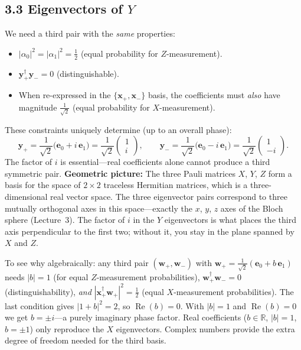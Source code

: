 \documentclass[12pt,a4paper]{article}
\begin{document}
\subsection{3.3 Eigenvectors of $Y$}
We need a third pair with the \emph{same} properties:
\begin{itemize}[nosep]
    \item $|\alpha_0|^2=|\alpha_1|^2=\tfrac{1}{2}$ (equal probability for $Z$-measurement).
    \item $\mathbf{y}_+^\dagger\mathbf{y}_-=0$ (distinguishable).
    \item When re-expressed in the $\{\mathbf{x}_+,\mathbf{x}_-\}$ basis, the coefficients must \emph{also} have magnitude $\frac{1}{\sqrt{2}}$ (equal probability for $X$-measurement).
\end{itemize}
These constraints uniquely determine (up to an overall phase):
\[
    \mathbf{y}_+ = \frac{1}{\sqrt{2}}\bigl(\mathbf{e}_0+i\,\mathbf{e}_1\bigr) = \frac{1}{\sqrt{2}}\begin{pmatrix}1\\i\end{pmatrix}, \qquad
    \mathbf{y}_- = \frac{1}{\sqrt{2}}\bigl(\mathbf{e}_0-i\,\mathbf{e}_1\bigr) = \frac{1}{\sqrt{2}}\begin{pmatrix}1\\-i\end{pmatrix}.
\]
The factor of $i$ is essential---real coefficients alone cannot produce a third symmetric pair.  \textbf{Geometric picture:} The three Pauli matrices $X$, $Y$, $Z$ form a basis for the space of $2\times 2$ traceless Hermitian matrices, which is a three-dimensional real vector space.  The three eigenvector pairs correspond to three mutually orthogonal axes in this space---exactly the $x$, $y$, $z$ axes of the Bloch sphere (Lecture~3).  The factor of $i$ in the $Y$ eigenvectors is what places the third axis perpendicular to the first two; without it, you stay in the plane spanned by $X$ and $Z$.

\medskip
\noindent To see why algebraically: any third pair $(\mathbf{w}_+, \mathbf{w}_-)$ with $\mathbf{w}_+ = \frac{1}{\sqrt{2}}(\mathbf{e}_0 + b\,\mathbf{e}_1)$ needs $|b|=1$ (for equal $Z$-measurement probabilities), $\mathbf{w}_+^\dagger\mathbf{w}_- = 0$ (distinguishability), \emph{and} $|\mathbf{x}_+^\dagger\mathbf{w}_+|^2 = \tfrac{1}{2}$ (equal $X$-measurement probabilities).  The last condition gives $|1+b|^2 = 2$, so $\operatorname{Re}(b)=0$.  With $|b|=1$ and $\operatorname{Re}(b)=0$ we get $b=\pm i$---a purely imaginary phase factor.  Real coefficients ($b\in\mathbb{R}$, $|b|=1$, $b=\pm 1$) only reproduce the $X$ eigenvectors.  Complex numbers provide the extra degree of freedom needed for the third basis.
\end{document}

